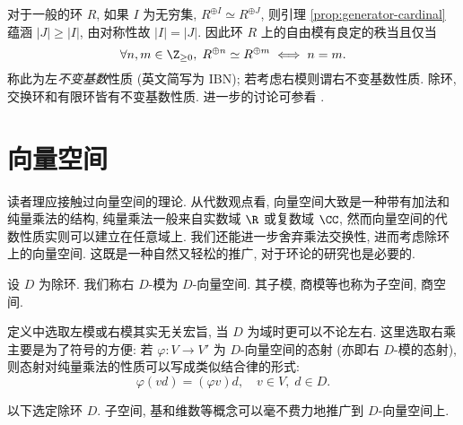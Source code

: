 \begin{remark}\label{rem:IBN}
	对于一般的环 $R$, 如果 $I$ 为无穷集, $R^{\oplus I} \simeq R^{\oplus J}$, 则引理 \ref{prop:generator-cardinal} 蕴涵 $|J| \geq |I|$, 由对称性故 $|I|=|J|$. 因此环 $R$ 上的自由模有良定的秩当且仅当
	\[ \forall n,m \in \Z_{\geq 0}, \; R^{\oplus n} \simeq R^{\oplus m} \iff n=m. \]
	称此为左\emph{不变基数}性质 (英文简写为 IBN); 若考虑右模则谓右不变基数性质. 除环, 交换环和有限环皆有不变基数性质. 进一步的讨论可参看 \cite[\S 1]{Lam99}.
\end{remark}

\section{向量空间}\label{sec:vector-space}
读者理应接触过向量空间的理论. 从代数观点看, 向量空间大致是一种带有加法和纯量乘法的结构, 纯量乘法一般来自实数域 $\R$ 或复数域 $\CC$, 然而向量空间的代数性质实则可以建立在任意域上. 我们还能进一步舍弃乘法交换性, 进而考虑除环上的向量空间. 这既是一种自然又轻松的推广, 对于环论的研究也是必要的.

\begin{definition}
	设 $D$ 为除环. 我们称右 $D$-模为 $D$-向量空间. 其子模, 商模等也称为子空间, 商空间.
\end{definition}
定义中选取左模或右模其实无关宏旨, 当 $D$ 为域时更可以不论左右. 这里选取右乘主要是为了符号的方便: 若 $\varphi: V \to V'$ 为 $D$-向量空间的态射 (亦即右 $D$-模的态射), 则态射对纯量乘法的性质可以写成类似结合律的形式:
\[ \varphi (vd) = (\varphi v)d, \quad v \in V, \; d \in D. \]

以下选定除环 $D$. 子空间, 基和维数等概念可以毫不费力地推广到 $D$-向量空间上.

